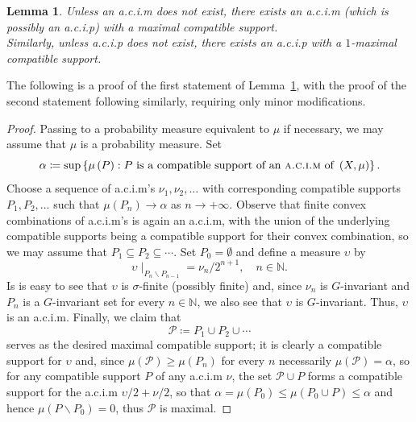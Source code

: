 \documentclass{amsart}
\numberwithin{equation}{subsection}
\newtheorem{lem}[thm]{Lemma}
\begin{document}
\begin{lem}
\label{lem:maxacip}
Unless an {\sc a.c.i.m} does not exist, there exists an {\sc a.c.i.m} (which is possibly an {\sc a.c.i.p}) with a maximal compatible support.\\
Similarly, unless {\sc a.c.i.p} does not exist, there exists an {\sc a.c.i.p} with a \(1\)-maximal compatible support.
\end{lem}

The following is a proof of the first statement of Lemma~\ref{lem:maxacip}, with the proof of the second statement following similarly, requiring only minor modifications.

\begin{proof}
Passing to a probability measure equivalent to \(\mu\) if necessary, we may assume that \(\mu\) is a probability measure. Set
\[\alpha\coloneqq \sup\left\{\mu\left(P\right):P\text{ is a compatible support of an {\sc a.c.i.m} of }\left(X,\mu\right)\right\}.\] 
Choose a sequence of {\sc a.c.i.m}'s \(\nu_{1},\nu_{2},\dotsc\) with corresponding compatible supports \(P_{1},P_{2},\dotsc\) such that \(\mu\left(P_{n}\right)\to\alpha\) as \(n\to +\infty\). Observe that finite convex combinations of {\sc a.c.i.m}'s is again an {\sc a.c.i.m}, with the union of the underlying compatible supports being a compatible support for their convex combination, so we may assume that \(P_{1}\subseteq P_{2}\subseteq\dotsm\). Set \(P_{0}=\emptyset\) and define a measure \(\upsilon\) by
\[\upsilon\mid_{P_{n}\backslash P_{n-1}}=\nu_{n}/2^{n+1},\quad n\in\mathbb{N}.\]
Is is easy to see that \(\upsilon\) is \(\sigma\)-finite (possibly finite) and, since \(\nu_{n}\) is \(G\)-invariant and \(P_{n}\) is a \(G\)-invariant set for every \(n\in\mathbb{N}\), we also see that \(\upsilon\) is \(G\)-invariant. Thus, \(\upsilon\) is an {\sc a.c.i.m}. Finally, we claim that
\[\mathcal{P}\coloneqq P_{1}\cup P_{2}\cup\dotsm\]
serves as the desired maximal compatible support; it is clearly a compatible support for \(\upsilon\) and, since \(\mu\left(\mathcal{P}\right)\geq\mu\left(P_{n}\right)\) for every \(n\) necessarily \(\mu\left(\mathcal{P}\right)=\alpha\), so for any compatible support \(P\) of any {\sc a.c.i.m} \(\nu\), the set \(\mathcal{P}\cup P\) forms a compatible support for the {\sc a.c.i.m} \(\upsilon/2+\nu/2\), so that \(\alpha=\mu\left(P_{0}\right)\leq\mu\left(P_{0}\cup P\right)\leq\alpha\) and hence \(\mu\left(P\backslash P_{0}\right)=0\), thus \(\mathcal{P}\) is maximal.
\end{proof}
\end{document}
